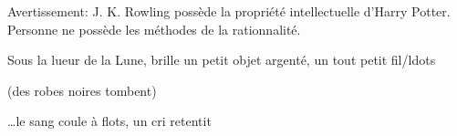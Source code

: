 Avertissement: J. K. Rowling possède la propriété intellectuelle d'Harry Potter. Personne ne possède les méthodes de la rationnalité.

\begin{em}
Sous la lueur de la Lune, brille un petit objet argenté, un tout petit fil{/ldots}

(des robes noires tombent)

{\ldots}le sang coule à flots, un cri retentit
\end{em}
